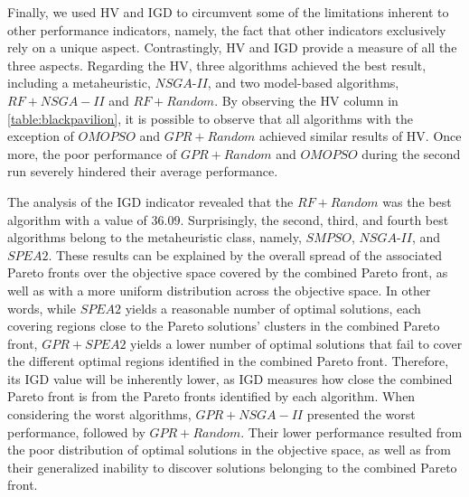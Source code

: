 Finally, we used \ac{HV} and \ac{IGD} to circumvent some of the limitations inherent to other performance indicators, namely, the fact that other indicators exclusively rely on a unique aspect. Contrastingly, \ac{HV} and \ac{IGD} provide a measure of all the three aspects. Regarding the \ac{HV}, three algorithms achieved the best result, including a metaheuristic, $NSGA$-$II$, and two model-based algorithms, $RF+NSGA-II$ and $RF+Random$. By observing the \ac{HV} column in \cref{table:blackpavilion}, it is possible to observe that all algorithms with the exception of $OMOPSO$ and $GPR+Random$ achieved similar results of \ac{HV}. Once more, the poor performance of $GPR+Random$ and $OMOPSO$ during the second run severely hindered their average performance.

The analysis of the \ac{IGD} indicator revealed that the $RF+Random$ was the best algorithm with a value of $36.09$. Surprisingly, the second, third, and fourth best algorithms belong to the metaheuristic class, namely, $SMPSO$, $NSGA$-$II$, and $SPEA2$. These results can be explained by the overall spread of the associated Pareto fronts over the objective space covered by the combined Pareto front, as well as with a more uniform distribution across the objective space. In other words, while $SPEA2$ yields a reasonable number of optimal solutions, each covering regions close to the Pareto solutions' clusters in the combined Pareto front, $GPR+SPEA2$ yields a lower number of optimal solutions that fail to cover the different optimal regions identified in the combined Pareto front. Therefore, its \ac{IGD} value will be inherently lower, as \ac{IGD} measures how close the combined Pareto front is from the Pareto fronts identified by each algorithm. When considering the worst algorithms, $GPR+NSGA-II$ presented the worst performance, followed by $GPR+Random$. Their lower performance resulted from the poor distribution of optimal solutions in the objective space, as well as from their generalized inability to discover solutions belonging to the combined Pareto front. 

